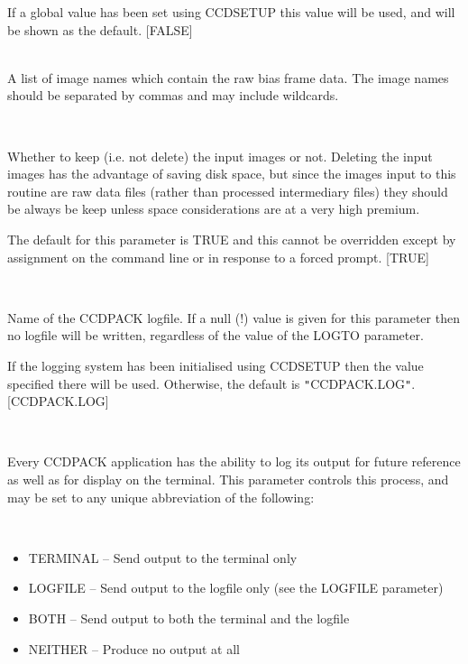 \documentclass[twoside,11pt]{article}
\newcommand{\htmlref}[2]{#1}
\renewcommand{\_}{\texttt{\symbol{95}}}
\newcommand{\qt}[1]{{\tt "}#1{\tt "}}
\newcommand{\xroutine}[1]{\htmlref{{\sc #1}}{#1}}
\newcommand{\sstsubsection}[1]{ \item[{#1}] \mbox{} \\}
\newcommand{\sstitemlist}[1]{
  \mbox{} \\
  \vspace{-3.5ex}
  \begin{itemize}
     #1
  \end{itemize}
}
\newcommand{\sstitem}{\item}
\newcommand{\sstsubsection}[1]{\item[{#1}]}
\newcommand{\sstitemlist}[1]{
      \begin{itemize}
         #1
      \end{itemize}
      \\
   }
\newcommand{\sstitem}{\item}
\begin{document}
{{{         If a global value has been set using \xroutine{CCDSETUP} this value
         will be used, and will be shown as the default.
         [FALSE]
      }
      \sstsubsection{
         IN = LITERAL (Read)
      } {
         A list of image names which contain the raw bias frame data.
         The image names should be separated by commas and may include wildcards.
      }
      \sstsubsection{
         KEEPIN = \_LOGICAL (Read)
      } {
         Whether to keep (i.e. not delete) the input images or not.
         Deleting the input images has the advantage of saving disk
         space, but since the images input to this routine are raw data
         files (rather than processed intermediary files) they should be
         always be keep unless space considerations are at a very high
         premium.

         The default for this parameter is TRUE and this cannot be
         overridden except by assignment on the command line or in
         response to a forced prompt.
         [TRUE]
      }
      \sstsubsection{
         LOGFILE = FILENAME (Read)
      } {
         Name of the CCDPACK logfile.  If a null (!) value is given for
         this parameter then no logfile will be written, regardless of
         the value of the LOGTO parameter.

         If the logging system has been initialised using \xroutine{CCDSETUP}
         then the value specified there will be used. Otherwise, the
         default is \qt{CCDPACK.LOG}.
         [CCDPACK.LOG]
      }
      \sstsubsection{
         LOGTO = LITERAL (Read)
      } {
         Every CCDPACK application has the ability to log its output
         for future reference as well as for display on the terminal.
         This parameter controls this process, and may be set to any
         unique abbreviation of the following:
         \sstitemlist{

            \sstitem
               TERMINAL  -- Send output to the terminal only

            \sstitem
               LOGFILE   -- Send output to the logfile only (see the
                               LOGFILE parameter)

            \sstitem
               BOTH      -- Send output to both the terminal and the
                               logfile

            \sstitem
               NEITHER   -- Produce no output at all

}}}}
\end{document}
